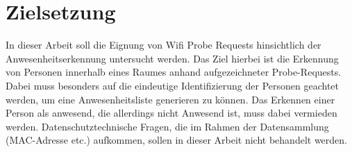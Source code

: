 \section{Zielsetzung}
\label{goal}

In dieser Arbeit soll die Eignung von Wifi Probe Requests hinsichtlich der Anwesenheitserkennung untersucht werden.
Das Ziel hierbei ist die Erkennung von Personen innerhalb eines Raumes anhand aufgezeichneter Probe-Requests.
\\

Dabei muss besonders auf die eindeutige Identifizierung der Personen geachtet werden, um eine Anwesenheitsliste generieren zu können.
Das Erkennen einer Person als anwesend, die allerdings nicht Anwesend ist, muss dabei vermieden werden.
Datenschutztechnische Fragen, die im Rahmen der Datensammlung (MAC-Adresse etc.) aufkommen, sollen in dieser Arbeit nicht behandelt werden.